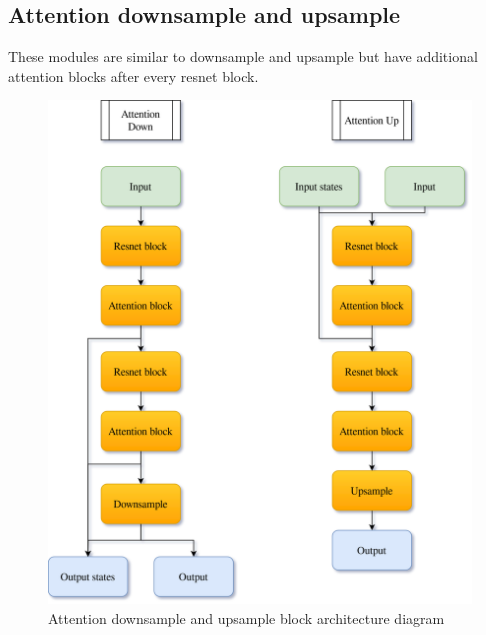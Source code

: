 \documentclass[11pt,a4paper]{report}
\begin{document}
\subsection{Attention downsample and upsample}
These modules are similar to downsample and upsample but have additional attention blocks after every resnet block.
\begin{figure}[H]
	\centering
	\includegraphics[scale=0.2]{images/AttentionDownUp.drawio}
    \caption{Attention downsample and upsample block architecture diagram}
\end{figure}
\end{document}
